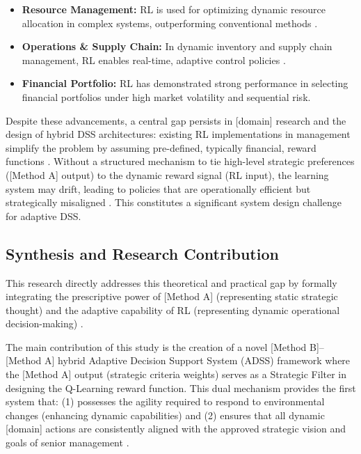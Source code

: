 \documentclass[10pt,twocolumn]{article}
\begin{document}
\begin{itemize}
  \item \textbf{Resource Management:} RL is used for optimizing
        dynamic resource allocation in complex systems,
        outperforming conventional methods \citep{Author2024b}.
  \item \textbf{Operations \& Supply Chain:} In dynamic inventory
        and supply chain management, RL enables real-time, adaptive
        control policies \citep{Author2022}.
  \item \textbf{Financial Portfolio:} RL has demonstrated strong
        performance in selecting financial portfolios under high
        market volatility and sequential risk.
\end{itemize}

Despite these advancements, a central gap persists in [domain]
research and the design of hybrid DSS architectures: existing RL
implementations in management simplify the problem by assuming
pre-defined, typically financial, reward functions
\citep{Author2022b}. Without a structured mechanism to tie
high-level strategic preferences ([Method A] output) to the
dynamic reward signal (RL input), the learning system may drift,
leading to policies that are operationally efficient but
strategically misaligned \citep{Author2023d}. This constitutes a
significant system design challenge for adaptive DSS.

\subsection{Synthesis and Research Contribution}

This research directly addresses this theoretical and practical gap
by formally integrating the prescriptive power of [Method A]
(representing static strategic thought) and the adaptive capability
of RL (representing dynamic operational decision-making)
\citep{Author2023e}.

The main contribution of this study is the creation of a novel
[Method B]--[Method A] hybrid Adaptive Decision Support System
(ADSS) framework where the [Method A] output (strategic criteria
weights) serves as a Strategic Filter in designing the Q-Learning
reward function. This dual mechanism provides the first system
that: (1) possesses the agility required to respond to
environmental changes (enhancing dynamic capabilities) and (2)
ensures that all dynamic [domain] actions are consistently aligned
with the approved strategic vision and goals of senior management
\citep{Author2021f}.
\end{document}
